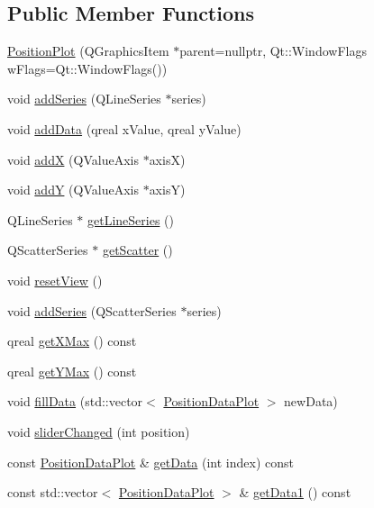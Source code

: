 \subsection*{Public Member Functions}
\begin{DoxyCompactItemize}
\item 
\hyperlink{class_position_plot_ac02288786b05c969ddde336ff57ed2c4}{Position\+Plot} (Q\+Graphics\+Item $\ast$parent=nullptr, Qt\+::\+Window\+Flags w\+Flags=Qt\+::\+Window\+Flags())
\item 
void \hyperlink{class_position_plot_a403766146dab39927aa578765f644625}{add\+Series} (Q\+Line\+Series $\ast$series)
\item 
void \hyperlink{class_position_plot_ad99acc56eb9f6ec4add56316362d2ccb}{add\+Data} (qreal x\+Value, qreal y\+Value)
\item 
void \hyperlink{class_position_plot_adf711353db86d512c0cab96e8014a96f}{addX} (Q\+Value\+Axis $\ast$axisX)
\item 
void \hyperlink{class_position_plot_a3b97e6e75b34fafa1e2d1d1f2102cac3}{addY} (Q\+Value\+Axis $\ast$axisY)
\item 
Q\+Line\+Series $\ast$ \hyperlink{class_position_plot_a575769756159b3d2b18ff6b900901193}{get\+Line\+Series} ()
\item 
Q\+Scatter\+Series $\ast$ \hyperlink{class_position_plot_abd0f91928fb87892d7ca9b72e44f74e8}{get\+Scatter} ()
\item 
void \hyperlink{class_position_plot_a9901c04061a3e7bdef306079d2ab93e5}{reset\+View} ()
\item 
void \hyperlink{class_position_plot_aee942a64feec593434a27b55047cd349}{add\+Series} (Q\+Scatter\+Series $\ast$series)
\item 
qreal \hyperlink{class_position_plot_a363124816b891420f4c9283de8863dda}{get\+X\+Max} () const
\item 
qreal \hyperlink{class_position_plot_a2a69244304b8495e090d777280775723}{get\+Y\+Max} () const
\item 
void \hyperlink{class_position_plot_adf099dfbd8ebfb4c352d38b099089d75}{fill\+Data} (std\+::vector$<$ \hyperlink{class_position_data_plot}{Position\+Data\+Plot} $>$ new\+Data)
\item 
void \hyperlink{class_position_plot_af739f0b7496fecbaff181df96f16a9e8}{slider\+Changed} (int position)
\item 
const \hyperlink{class_position_data_plot}{Position\+Data\+Plot} \& \hyperlink{class_position_plot_a63b9aead49ebd84606a18678754b3d55}{get\+Data} (int index) const
\item 
const std\+::vector$<$ \hyperlink{class_position_data_plot}{Position\+Data\+Plot} $>$ \& \hyperlink{class_position_plot_a447105589f7cbf94cbe7018722103c7b}{get\+Data1} () const
\end{DoxyCompactItemize}


